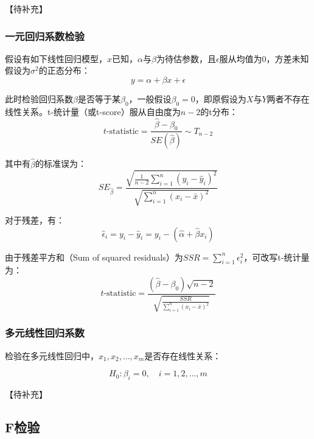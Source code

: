 \documentclass[11pt]{article}
\begin{document}
【待补充】

\subsubsection{一元回归系数检验}

假设有如下线性回归模型，$x$已知，$\alpha$与$\beta$为待估参数，且$\epsilon$服从均值为0，方差未知假设为$\sigma^2$的正态分布：
\begin{equation*}
    y = \alpha + \beta x + \epsilon
\end{equation*}

此时检验回归系数$\beta$是否等于某$\beta_0$，一般假设$\beta_0 = 0$，即原假设为$X$与$Y$两者不存在线性关系。t-统计量（或t-score）服从自由度为$n-2$的t分布：
\begin{equation*}
    t\text{-statistic} = \frac{\hat{\beta} - \beta_0}{SE(\hat{\beta})} \sim T_{n-2}
\end{equation*}

其中有$\hat{\beta}$的标准误为：
\begin{equation*}
    SE_{\hat{\beta}} = \frac{\sqrt{\frac{1}{n-2} \sum_{i=1}^{n} (y_i - \hat{y}_i)^2}}{\sqrt{\sum_{i=1}^{n} (x_i - \bar{x})^2}}
\end{equation*}

对于残差，有：
\begin{equation*}
    \hat{\epsilon}_i = y_i - \hat{y}_i = y_i - (\hat{\alpha} + \hat{\beta} x_i )
\end{equation*}

由于残差平方和（Sum of squared residuals）为$SSR=\sum_{i=1}^n \epsilon_i^2$，可改写t-统计量为：
\begin{equation*}
    t\text{-statistic} = \frac{(\hat{\beta} - \beta_0)\sqrt{n-2}}{\sqrt{\frac{SSR}{\sum_{i=1}^{n} (x_i - \bar{x})^2}}}
\end{equation*}

\subsubsection{多元线性回归系数}

检验在多元线性回归中，$x_1,x_2,\dots,x_m$是否存在线性关系：

\begin{equation*}
    H_0: \beta_i = 0, \quad i=1,2,\dots,m
\end{equation*}

【待补充】

\subsection{F检验}
\end{document}
